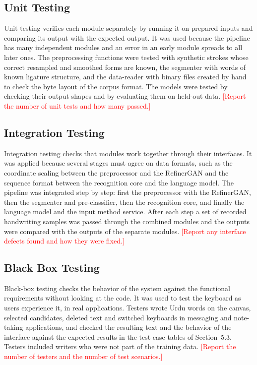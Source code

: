 \documentclass[12pt,a4paper]{report}
\newcommand{\todo}[1]{\textcolor{red}{[#1]}}
\begin{document}
\subsection{Unit Testing}
Unit testing verifies each module separately by running it on prepared inputs and comparing its output with the expected output. It was used because the pipeline has many independent modules and an error in an early module spreads to all later ones. The preprocessing functions were tested with synthetic strokes whose correct resampled and smoothed forms are known, the segmenter with words of known ligature structure, and the data-reader with binary files created by hand to check the byte layout of the corpus format. The models were tested by checking their output shapes and by evaluating them on held-out data. \todo{Report the number of unit tests and how many passed.}

\subsection{Integration Testing}
Integration testing checks that modules work together through their interfaces. It was applied because several stages must agree on data formats, such as the coordinate scaling between the preprocessor and the RefinerGAN and the sequence format between the recognition core and the language model. The pipeline was integrated step by step: first the preprocessor with the RefinerGAN, then the segmenter and pre-classifier, then the recognition core, and finally the language model and the input method service. After each step a set of recorded handwriting samples was passed through the combined modules and the outputs were compared with the outputs of the separate modules. \todo{Report any interface defects found and how they were fixed.}

\subsection{Black Box Testing}
Black-box testing checks the behavior of the system against the functional requirements without looking at the code. It was used to test the keyboard as users experience it, in real applications. Testers wrote Urdu words on the canvas, selected candidates, deleted text and switched keyboards in messaging and note-taking applications, and checked the resulting text and the behavior of the interface against the expected results in the test case tables of Section~5.3. Testers included writers who were not part of the training data. \todo{Report the number of testers and the number of test scenarios.}
\end{document}
